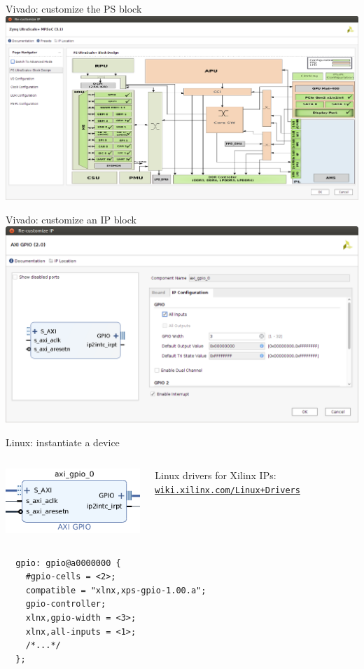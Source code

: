 \documentclass[xetex,table]{beamer}
\begin{document}
\begin{frame}{Vivado: customize the PS block}
  \center\includegraphics[width=1.0\textwidth]{images/customize-ps.png}
\end{frame}

\begin{frame}{Vivado: customize an IP block}
  \center\includegraphics[width=1.0\textwidth]{images/customize-gpio.png}
\end{frame}

\begin{frame}[fragile]{Linux: instantiate a device}
  \begin{columns}
    \center\includegraphics[height=0.2\textheight]{images/block-design-gpio.png}

    Linux drivers for Xilinx IPs:
    \href{http://www.wiki.xilinx.com/Linux+Drivers}{\tt wiki.xilinx.com/Linux+Drivers}
  \end{columns}

  \begin{verbatim}
  gpio: gpio@a0000000 {
    #gpio-cells = <2>;
    compatible = "xlnx,xps-gpio-1.00.a";
    gpio-controller;
    xlnx,gpio-width = <3>;
    xlnx,all-inputs = <1>;
    /*...*/
  };
  \end{verbatim}
\end{frame}
\end{document}
